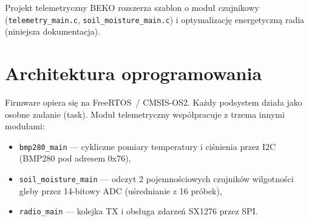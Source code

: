\documentclass[12pt,a4paper]{article}
\begin{document}
Projekt telemetryczny BEKO rozszerza szablon o moduł czujnikowy
(\texttt{telemetry\_main.c}, \texttt{soil\_moisture\_main.c}) i optymalizację
energetyczną radia (niniejsza dokumentacja).

\section{Architektura oprogramowania}

Firmware opiera się na FreeRTOS~/ CMSIS-OS2. Każdy podsystem działa jako
osobne zadanie (task). Moduł telemetryczny współpracuje z trzema innymi
modułami:

\begin{itemize}[noitemsep]
  \item \texttt{bmp280\_main} — cykliczne pomiary temperatury i ciśnienia
        przez I2C (BMP280 pod adresem 0x76),
  \item \texttt{soil\_moisture\_main} — odczyt 2 pojemnościowych czujników
        wilgotności gleby przez 14-bitowy ADC (uśrednianie z 16 próbek),
  \item \texttt{radio\_main} — kolejka TX i obsługa zdarzeń SX1276 przez SPI.
\end{itemize}
\end{document}
